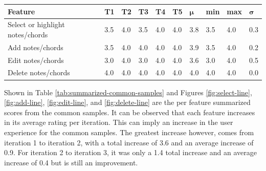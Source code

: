 		\begin{table}[H]
		  \centering
		   \label{tab:common-samples-it3}
		  \begin{tabular}{|p{3cm}|R{.7cm}|R{.7cm}|R{.7cm}|R{.7cm}|R{.7cm}|R{.8cm}|R{.8cm}|R{.8cm}|R{.8cm}|}
		  	\hline
		  	\textbf{Feature} & \textbf{T1} & \textbf{T2} & \textbf{T3} & \textbf{T4} & \textbf{T5} & \begin{math}\bm{\mu}\end{math} & \textbf{min} & \textbf{max} & \begin{math}\bm{\sigma}\end{math} \\ \hline

		  	Select or highlight notes/chords 	& 3.5 & 4.0 & 3.5 & 4.0 & 4.0 & 3.8 & 3.5 & 4.0 & 0.3 \\ \hline
			Add notes/chords 						& 3.5 & 4.0 & 4.0 & 4.0 & 4.0 & 3.9 & 3.5 & 4.0 & 0.2 \\ \hline
			Edit notes/chords 						& 3.0 & 4.0 & 3.0 & 4.0 & 4.0 & 3.6 & 3.0 & 4.0 & 0.5 \\ \hline
			Delete notes/chords 					& 4.0 & 4.0 & 4.0 & 4.0 & 4.0 & 4.0 & 4.0 & 4.0 & 0.0 \\ \hline

		  \end{tabular}
		\end{table}

		Shown in Table \ref{tab:summarized-common-samples} and Figures \ref{fig:select-line}, \ref{fig:add-line}, \ref{fig:edit-line}, and \ref{fig:delete-line} are the per feature summarized scores from the common samples. It can be observed that each feature increases in its average rating per iteration. This can imply an increase in the user experience for the common samples. The greatest increase however, comes from iteration 1 to iteration 2, with a total increase of 3.6 and an average increase of 0.9. For iteration 2 to iteration 3, it was only a 1.4 total increase and an average increase of 0.4 but is still an improvement. 


